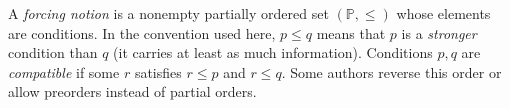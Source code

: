 
A \emph{forcing notion} is a nonempty partially ordered set $(\mathbb P,\le)$ whose elements are conditions. In the convention used here, $p\le q$ means that $p$ is a \emph{stronger} condition than $q$ (it carries at least as much information). Conditions $p,q$ are \emph{compatible} if some $r$ satisfies $r\le p$ and $r\le q$. Some authors reverse this order or allow preorders instead of partial orders.
